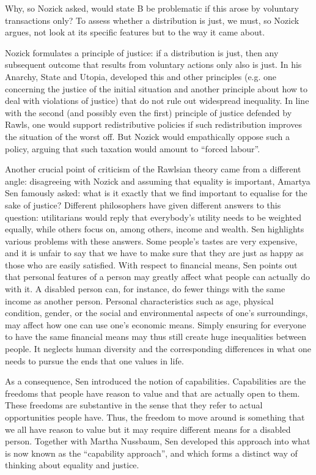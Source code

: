 \documentclass[11pt]{article}
\begin{document}
Why, so Nozick asked, would state B be problematic if this arose by voluntary transactions only? To assess whether a distribution is just, we must, so Nozick argues, not look at its specific features but to the way it came about.

Nozick formulates a principle of justice: if a distribution is just, then any subsequent outcome that results from voluntary actions only also is just. In his Anarchy, State and Utopia, \textcite{Nozick1971} developed this and other principles (e.g. one concerning the justice of the initial situation and another principle about how to deal with violations of justice) that do not rule out widespread inequality. In line with the second (and possibly even the first) principle of justice defended by Rawls, one would support redistributive policies if such redistribution improves the situation of the worst off. But Nozick would empathically oppose such a policy, arguing that such taxation would amount to ``forced labour”.

Another crucial point of criticism of the Rawlsian theory came from a different angle: disagreeing with Nozick and assuming that equality is important, Amartya Sen famously asked: what is it exactly that we find important to equalise for the sake of justice? Different philosophers have given different answers to this question: utilitarians would reply that everybody’s utility needs to be weighted equally, while others focus on, among others, income and wealth. Sen highlights various problems with these answers. Some people’s tastes are very expensive,
and it is unfair to say that we have to make sure that they are just as happy as those who are easily satisfied. With respect to financial means, Sen points out that personal features of a person may greatly affect what people can actually do with it. A disabled person can, for instance, do fewer things with the same income as another person. Personal characteristics such as age, physical condition,
gender, or the social and environmental aspects of one’s surroundings, may affect how one can use one’s economic means. Simply ensuring for everyone to have the same financial means may thus still create huge inequalities between people. It neglects human diversity and the corresponding differences in what one needs to pursue the ends that one values in life.

As a consequence, Sen introduced the notion of capabilities. Capabilities are the freedoms that people have reason to value and that are actually open to them. These freedoms are substantive in the sense that they refer to actual opportunities people have. Thus, the freedom to move around is something that we all have reason to value but it may require different means for a disabled person. Together with Martha Nussbaum, Sen developed this approach into what is now known as the “capability approach”, and which forms a distinct way of thinking about equality and justice.
\end{document}
